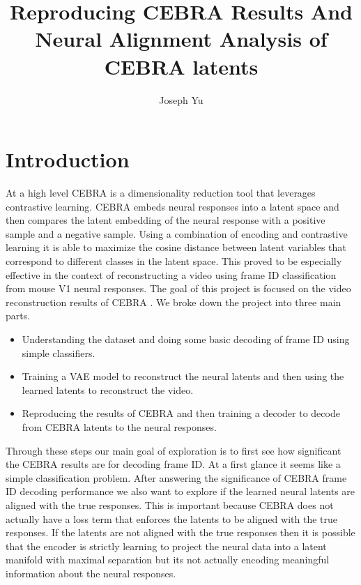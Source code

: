 \documentclass[12pt, letterpaper]{article}
\author{Joseph Yu}
\title{Reproducing CEBRA Results And Neural Alignment Analysis of CEBRA latents}
\begin{document}
\maketitle
\section{Introduction}
\label{sec:introduction}
At a high level CEBRA \cite{schneider2023} is a dimensionality reduction tool that leverages contrastive learning. CEBRA \cite{schneider2023} embeds neural responses into a latent space and then compares the latent embedding of the neural response with a positive sample and a negative sample. Using a combination of encoding and contrastive learning it is able to maximize the cosine distance between latent variables that correspond to different classes in the latent space. This proved to be especially effective in the context of reconstructing a video using frame ID classification from mouse V1 neural responses. The goal of this project is focused on the video reconstruction results of CEBRA \cite{schneider2023}. We broke down the project into three main parts. 
\begin{itemize}
    \item Understanding the dataset and doing some basic decoding of frame ID using simple classifiers.
    \item Training a VAE model to reconstruct the neural latents and then using the learned latents to reconstruct the video.
    \item Reproducing the results of CEBRA \cite{schneider2023} and then training a decoder to decode from CEBRA \cite{schneider2023} latents to the neural responses.
\end{itemize}

Through these steps our main goal of exploration is to first see how significant the CEBRA \cite{schneider2023} results are for decoding frame ID. At a first glance it seems like a simple classification problem. After answering the significance of CEBRA \cite{schneider2023} frame ID decoding performance we also want to explore if the learned neural latents are aligned with the true responses. This is important because CEBRA \cite{schneider2023} does not actually have a loss term that enforces the latents to be aligned with the true responses. If the latents are not aligned with the true responses then it is possible that the encoder is strictly learning to project the neural data into a latent manifold with maximal separation but its not actually encoding meaningful information about the neural responses.
\end{document}
